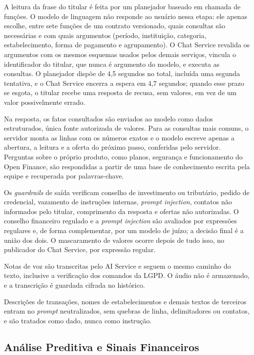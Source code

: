 A leitura da frase do titular é feita por um planejador baseado em chamada de funções. O modelo de linguagem não responde ao usuário nessa etapa: ele apenas escolhe, entre sete funções de um contrato versionado, quais consultas são necessárias e com quais argumentos (período, instituição, categoria, estabelecimento, forma de pagamento e agrupamento). O Chat Service revalida os argumentos com os mesmos esquemas usados pelos demais serviços, vincula o identificador do titular, que nunca é argumento do modelo, e executa as consultas. O planejador dispõe de 4,5 segundos no total, incluída uma segunda tentativa, e o Chat Service encerra a espera em 4,7 segundos; quando esse prazo se esgota, o titular recebe uma resposta de recusa, sem valores, em vez de um valor possivelmente errado.

Na resposta, os fatos consultados são enviados ao modelo como dados estruturados, única fonte autorizada de valores. Para as consultas mais comuns, o servidor monta as linhas com os números exatos e o modelo escreve apenas a abertura, a leitura e a oferta do próximo passo, conferidas pelo servidor. Perguntas sobre o próprio produto, como planos, segurança e funcionamento do Open Finance, são respondidas a partir de uma base de conhecimento escrita pela equipe e recuperada por palavras-chave.

Os \textit{guardrails} de saída verificam conselho de investimento ou tributário, pedido de credencial, vazamento de instruções internas, \textit{prompt injection}, contatos não informados pelo titular, comprimento da resposta e ofertas não autorizadas. O conselho financeiro regulado e a \textit{prompt injection} são avaliados por expressões regulares e, de forma complementar, por um modelo de juízo; a decisão final é a união dos dois. O mascaramento de valores ocorre depois de tudo isso, no publicador do Chat Service, por expressão regular.

Notas de voz são transcritas pelo AI Service e seguem o mesmo caminho do texto, inclusive a verificação dos comandos da LGPD. O áudio não é armazenado, e a transcrição é guardada cifrada no histórico.

Descrições de transações, nomes de estabelecimentos e demais textos de terceiros entram no \textit{prompt} neutralizados, sem quebras de linha, delimitadores ou contatos, e são tratados como dado, nunca como instrução.

\subsection{Análise Preditiva e Sinais Financeiros}

